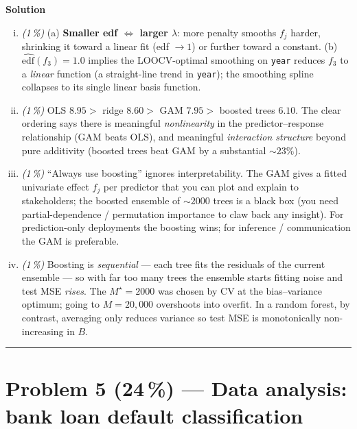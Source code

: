 \documentclass[11pt,a4paper]{article}
\newcommand{\points}[1]{\textbf{(#1\,\%)}}
\newcommand{\subpoints}[1]{\textit{(#1\,\%)}}
\newcommand{\sol}{\noindent\textbf{Solution}}
\begin{document}
\sol{}
\begin{enumerate}[(i)]
  \item \subpoints{1} (a) \textbf{Smaller edf $\Leftrightarrow$ larger $\lambda$}: more penalty
        smooths $f_j$ harder, shrinking it toward a linear fit (edf $\to 1$) or further toward a
        constant. (b) $\widehat{\mathrm{edf}}(f_3) = 1.0$ implies the LOOCV-optimal smoothing on
        \texttt{year} reduces $f_3$ to a \emph{linear} function (a straight-line trend in
        \texttt{year}); the smoothing spline collapses to its single linear basis function.

  \item \subpoints{1} OLS $8.95 >$ ridge $8.60 >$ GAM $7.95 >$ boosted trees $6.10$. The clear
        ordering says there is meaningful \emph{nonlinearity} in the predictor--response
        relationship (GAM beats OLS), and meaningful \emph{interaction structure} beyond pure
        additivity (boosted trees beat GAM by a substantial $\sim 23\%$).

  \item \subpoints{1} ``Always use boosting'' ignores interpretability. The GAM gives a fitted
        univariate effect $f_j$ per predictor that you can plot and explain to stakeholders; the
        boosted ensemble of $\sim 2000$ trees is a black box (you need partial-dependence /
        permutation importance to claw back any insight). For prediction-only deployments the
        boosting wins; for inference / communication the GAM is preferable.

  \item \subpoints{1} Boosting is \emph{sequential} --- each tree fits the residuals of the
        current ensemble --- so with far too many trees the ensemble starts fitting noise and test
        MSE \emph{rises}. The $M^\star = 2000$ was chosen by CV at the bias--variance optimum;
        going to $M = 20{,}000$ overshoots into overfit. In a random forest, by contrast,
        averaging only reduces variance so test MSE is monotonically non-increasing in $B$.
\end{enumerate}

\vspace{0.6em}
\hrule
\vspace{1em}

\section*{Problem 5 \points{24} --- Data analysis: bank loan default classification}
\end{document}
